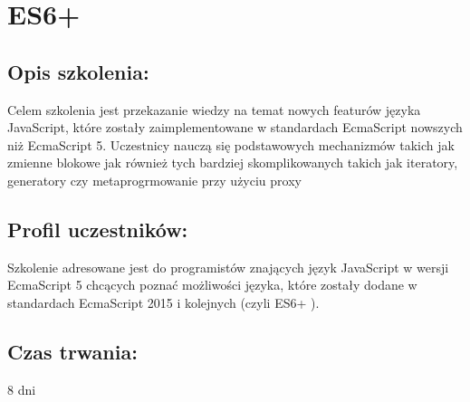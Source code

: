\documentclass{article}[10pt]
\begin{document}
\newpage


    
	\section{ES6+}

	\subsection*{Opis szkolenia:}
	\begin{adjustwidth}{2cm}{}
\justifying
		
Celem szkolenia jest przekazanie wiedzy na temat nowych featurów języka JavaScript, które zostały zaimplementowane w standardach EcmaScript nowszych niż EcmaScript 5. Uczestnicy nauczą się podstawowych mechanizmów takich jak zmienne blokowe jak również tych bardziej skomplikowanych takich jak iteratory, generatory czy metaprogrmowanie przy użyciu proxy

	\end{adjustwidth}
	\subsection*{Profil uczestników:}
\begin{adjustwidth}{2cm}{}
\justifying
	
Szkolenie adresowane jest do programistów znających język JavaScript w wersji EcmaScript 5 chcących poznać możliwości języka, które zostały dodane w standardach EcmaScript 2015 i kolejnych (czyli ES6+ ).
\end{adjustwidth}
	\subsection*{Czas trwania:}
\begin{adjustwidth}{2cm}{}
	8 dni
\end{adjustwidth}
\end{document}
